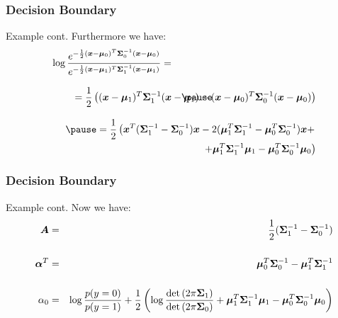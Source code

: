 \begin{frame}
  \frametitle{Decision Boundary \cont}

  \begin{ovalblock}{Example cont.}
    \small
    Furthermore we have:
    \begin{eqnarray*}
      \log{ 
        \frac{e^{ - \frac{1}{2} (\vec{x} - \vec{\mu}_0)^T \mat{\Sigma}_0^{-1} (\vec{x} - \vec{\mu}_0)} }
             {e^{ - \frac{1}{2} (\vec{x} - \vec{\mu}_1)^T \mat{\Sigma}_1^{-1} (\vec{x} - \vec{\mu}_1)} }
      } & = & \\[.3cm]
      & & \pause \hspace{-5cm} =
      \frac{1}{2} 
      \left(
        (\vec{x} - \vec{\mu}_1)^T \mat{\Sigma}_1^{-1} (\vec{x} - \vec{\mu}_1) - (\vec{x} - \vec{\mu}_0)^T \mat{\Sigma}_0^{-1} (\vec{x} - \vec{\mu}_0)
      \right) \\[.3cm]
      & & \hspace{-5cm} \pause =
      \frac{1}{2} 
      \left(
        \vec{x}^T (\mat{\Sigma}_1^{-1} - \mat{\Sigma}_0^{-1}) \vec{x} 
        -2 (\vec{\mu}_1^T \mat{\Sigma}_1^{-1} - \vec{\mu}_0^T \mat{\Sigma}_0^{-1} ) \vec{x} + \right.\\
        & & \left. \hspace{-4cm} 
        + \vec{\mu}_1^T \mat{\Sigma}_1^{-1} \vec{\mu}_1 - \vec{\mu}_0^T \mat{\Sigma}_0^{-1} \vec{\mu}_0
      \right)
    \end{eqnarray*}
  \end{ovalblock}
\end{frame}
 
 
\begin{frame}
  \frametitle{Decision Boundary \cont}
  
  \begin{ovalblock}{Example cont.}
    \small
    Now we have:
    \begin{eqnarray*}
      {\bm A}        &=& \frac{1}{2} ({\bm \Sigma}_1^{-1} - {\bm \Sigma}_0^{-1}) \\[.5cm]
      {\bm \alpha}^T &=& {\bm \mu}_0^T {\bm \Sigma}_0^{-1} - {\bm \mu}_1^T {\bm \Sigma}_1^{-1} \\[.5cm]
      \alpha_0       &=& \log \frac{p(y=0)}{p(y=1)} + \frac{1}{2}
                         \left(
                           \log
                             \frac{ \det{( 2 \pi \ensuremath{{\bm \Sigma}}_1)}}
                                  { \det{( 2 \pi \ensuremath{{\bm \Sigma}}_0)}} + 
                             {\bm \mu}_1^T {\bm \Sigma}_1^{-1} {\bm \mu}_1 -
                             {\bm \mu}_0^T {\bm \Sigma}_0^{-1} {\bm \mu}_0
                         \right)
    \end{eqnarray*}
  \end{ovalblock}
\end{frame}
  
